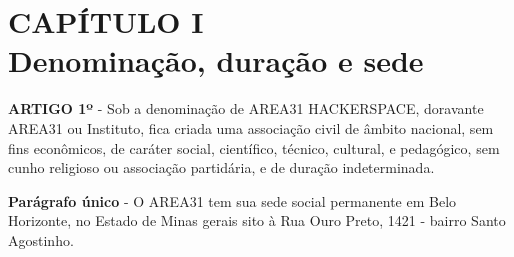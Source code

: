 \chapter*{CAPÍTULO I \\ Denominação, duração e sede}

\textbf{ARTIGO 1º} - Sob a denominação de AREA31 HACKERSPACE, 
doravante AREA31 ou Instituto, fica criada uma associação civil de 
âmbito nacional, sem fins econômicos, de caráter social, científico, 
técnico, cultural, e pedagógico, sem cunho religioso ou associação 
partidária, e de duração indeterminada.

\textbf{Parágrafo único} - O AREA31 tem sua sede social permanente em 
Belo Horizonte, no Estado de Minas gerais sito à Rua Ouro Preto, 
1421 - bairro Santo Agostinho.
